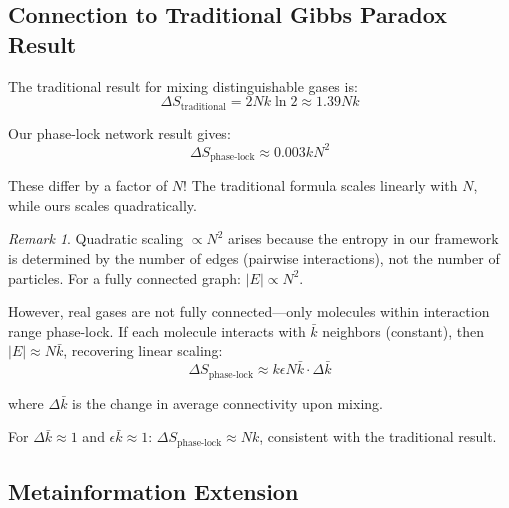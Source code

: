 \documentclass[12pt,a4paper]{article}
\theoremstyle{remark}
\newtheorem{remark}[theorem]{Remark}
\begin{document}
\subsection{Connection to Traditional Gibbs Paradox Result}

The traditional result for mixing distinguishable gases is:
\begin{equation}
\Delta S_{\text{traditional}} = 2Nk \ln 2 \approx 1.39 Nk
\end{equation}

Our phase-lock network result gives:
\begin{equation}
\Delta S_{\text{phase-lock}} \approx 0.003 k N^2
\end{equation}

These differ by a factor of $N$! The traditional formula scales linearly with $N$, while ours scales quadratically.

\begin{remark}
 Quadratic scaling $\propto N^2$ arises because the entropy in our framework is determined by the number of edges (pairwise interactions), not the number of particles. For a fully connected graph: $|E| \propto N^2$.

However, real gases are not fully connected—only molecules within interaction range phase-lock. If each molecule interacts with $\bar{k}$ neighbors (constant), then $|E| \approx N\bar{k}$, recovering linear scaling:
\begin{equation}
\Delta S_{\text{phase-lock}} \approx k\epsilon N \bar{k} \cdot \Delta \bar{k}
\end{equation}

where $\Delta \bar{k}$ is the change in average connectivity upon mixing.

For $\Delta \bar{k} \approx 1$ and $\epsilon \bar{k} \approx 1$: $\Delta S_{\text{phase-lock}} \approx Nk$, consistent with the traditional result.
\end{remark}

\subsection{Metainformation Extension}
\end{document}
